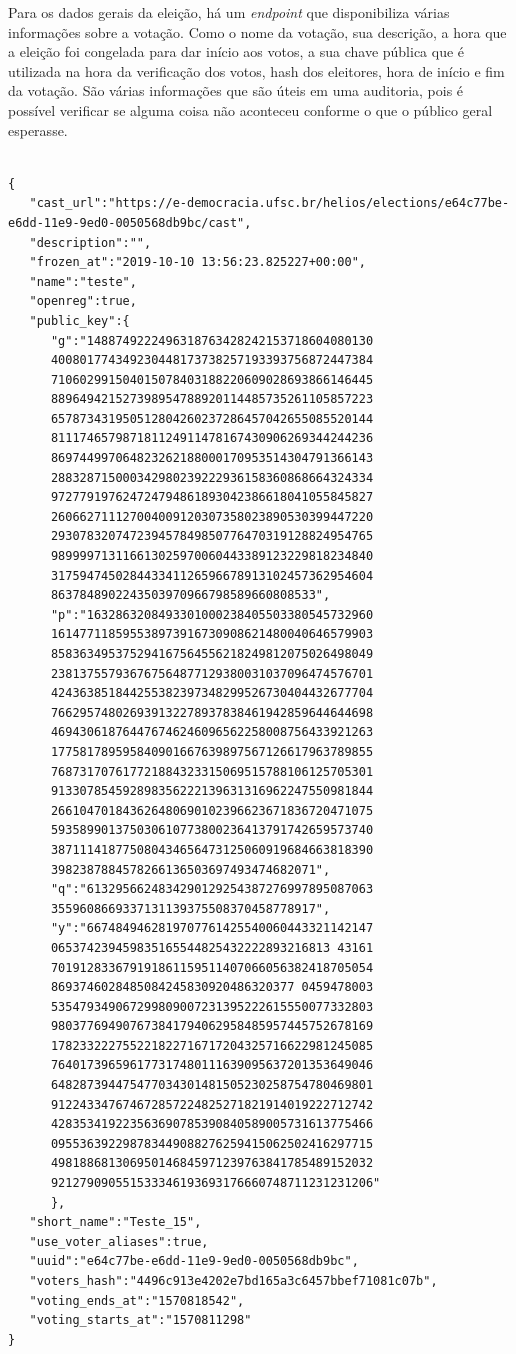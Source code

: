 \documentclass{ufsctex/ufsctex}
\begin{document}
Para os dados gerais da eleição, há um \textit{endpoint} que disponibiliza
várias informações sobre a votação. Como o nome da votação, sua descrição, a
hora que a eleição foi congelada para dar início aos votos, a sua chave pública
que é utilizada na hora da verificação dos votos, hash dos eleitores, hora de
início e fim da votação. São várias informações que são úteis em uma auditoria,
pois é possível verificar se alguma coisa não aconteceu conforme o que o
público geral esperasse.


\begin{lstlisting}[numbers=none]

{
   "cast_url":"https://e-democracia.ufsc.br/helios/elections/e64c77be-e6dd-11e9-9ed0-0050568db9bc/cast",
   "description":"",
   "frozen_at":"2019-10-10 13:56:23.825227+00:00",
   "name":"teste",
   "openreg":true,
   "public_key":{
	  "g":"1488749222496318763428242153718604080130
	  400801774349230448173738257193393756872447384
	  710602991504015078403188220609028693866146445
	  889649421527398954788920114485735261105857223
	  657873431950512804260237286457042655085520144
	  811174657987181124911478167430906269344244236
	  869744997064823262188000170953514304791366143
	  288328715000342980239222936158360868664324334
	  972779197624724794861893042386618041055845827
	  260662711127004009120307358023890530399447220
	  293078320747239457849850776470319128824954765
	  989999713116613025970060443389123229818234840
	  317594745028443341126596678913102457362954604
	  8637848902243503970966798589660808533",
	  "p":"1632863208493301000238405503380545732960
	  161477118595538973916730908621480040646579903
	  858363495375294167564556218249812075026498049
	  238137557936767564877129380031037096474576701
	  424363851844255382397348299526730404432677704
	  766295748026939132278937838461942859644644698
	  469430618764476746246096562258008756433921263
	  177581789595840901667639897567126617963789855
	  768731707617721884323315069515788106125705301
	  913307854592898356222139631316962247550981844
	  266104701843626480690102396623671836720471075
	  593589901375030610773800236413791742659573740
	  387111418775080434656473125060919684663818390
	  3982387884578266136503697493474682071",
	  "q":"6132956624834290129254387276997895087063
	  3559608669337131139375508370458778917",
	  "y":"6674849462819707761425540060443321142147
	  065374239459835165544825432222893216813 43161
	  701912833679191861159511407066056382418705054
	  8693746028485084245830920486320377 0459478003
	  535479349067299809007231395222615550077332803
	  980377694907673841794062958485957445752678169
	  178233222755221822716717204325716622981245085
	  764017396596177317480111639095637201353649046
	  648287394475477034301481505230258754780469801
	  912243347674672857224825271821914019222712742
	  428353419223563690785390840589005731613775466
	  095536392298783449088276259415062502416297715
	  498188681306950146845971239763841785489152032
	  921279090551533346193693176660748711231231206"
	  },
   "short_name":"Teste_15",
   "use_voter_aliases":true,
   "uuid":"e64c77be-e6dd-11e9-9ed0-0050568db9bc",
   "voters_hash":"4496c913e4202e7bd165a3c6457bbef71081c07b",
   "voting_ends_at":"1570818542",
   "voting_starts_at":"1570811298"
}


\end{lstlisting}
\end{document}
